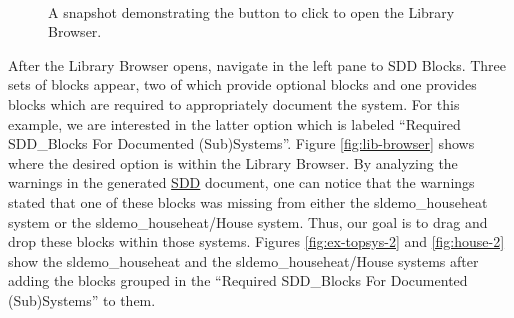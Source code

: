 \documentclass{mcscert}
\begin{document}
\begin{figure}
	\caption{A snapshot demonstrating the button to click to open the Library Browser.}
	\centering
	\label{fig:open-lib-browser}
	\\
\end{figure}

After the Library Browser opens, navigate in the left pane to SDD Blocks. 
Three sets of blocks appear, two of which provide optional blocks and one provides blocks which are required to appropriately document the system. 
For this example, we are interested in the latter option which is labeled ``Required SDD\_Blocks For Documented (Sub)Systems''. 
Figure \ref{fig:lib-browser} shows where the desired option is within the Library Browser. 
By analyzing the warnings in the generated \hyperref[acr:sdd]{SDD} document, one can notice that the warnings stated that one of these blocks was missing from either the sldemo\_househeat system or the sldemo\_househeat/House system. 
Thus, our goal is to drag and drop these blocks within those systems. 
Figures \ref{fig:ex-topsys-2} and \ref{fig:house-2} show the sldemo\_househeat and the sldemo\_househeat/House systems after adding the blocks grouped in the ``Required SDD\_Blocks For Documented (Sub)Systems'' to them.
\end{document}
